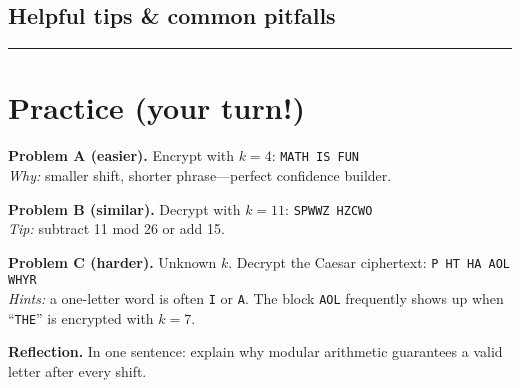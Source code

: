 \documentclass[12pt]{article}
\newcommand{\workbox}[1]{\fbox{\parbox{\dimexpr\textwidth-2\fboxsep-2\fboxrule\relax}{\vspace{#1}}}}
\begin{document}
\subsection*{Helpful tips \& common pitfalls}

\bigskip
\hrule
\vspace{0.6em}

\section*{Practice (your turn!)}

\textbf{Problem A (easier).} Encrypt with \(k=4\): \texttt{MATH IS FUN} \\
\emph{Why:} smaller shift, shorter phrase—perfect confidence builder.
\workbox{2.0cm}

\textbf{Problem B (similar).} Decrypt with \(k=11\): \texttt{SPWWZ HZCWO} \\
\emph{Tip:} subtract 11 mod 26 or add 15.
\workbox{2.0cm}

\textbf{Problem C (harder).} Unknown \(k\). Decrypt the Caesar ciphertext: \texttt{P HT HA AOL WHYR} \\
\emph{Hints:} a one-letter word is often \texttt{I} or \texttt{A}. The block \texttt{AOL} frequently shows up when ``\texttt{THE}'' is encrypted with \(k=7\).
\workbox{2.4cm}

\bigskip
\textbf{Reflection.} In one sentence: explain why modular arithmetic guarantees a valid letter after every shift. \\
\workbox{1.2cm}
\end{document}

